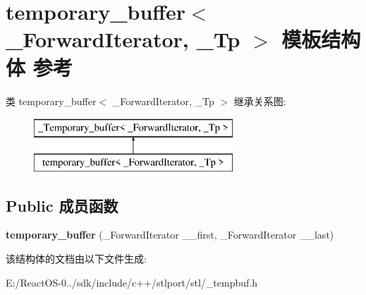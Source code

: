 \hypertarget{structtemporary__buffer}{}\section{temporary\+\_\+buffer$<$ \+\_\+\+Forward\+Iterator, \+\_\+\+Tp $>$ 模板结构体 参考}
\label{structtemporary__buffer}
类 temporary\+\_\+buffer$<$ \+\_\+\+Forward\+Iterator, \+\_\+\+Tp $>$ 继承关系图\+:\begin{figure}[H]
\begin{center}
\leavevmode
\includegraphics[height=2.000000cm]{structtemporary__buffer}
\end{center}
\end{figure}
\subsection*{Public 成员函数}
\begin{DoxyCompactItemize}
\item 
\mbox{\label{structtemporary__buffer_a5d694112b9dca43f4545ff35cac87419}} 
{\bfseries temporary\+\_\+buffer} (\+\_\+\+Forward\+Iterator \+\_\+\+\_\+first, \+\_\+\+Forward\+Iterator \+\_\+\+\_\+last)
\end{DoxyCompactItemize}


该结构体的文档由以下文件生成\+:\begin{DoxyCompactItemize}
\item 
E\+:/\+React\+O\+S-\/0../sdk/include/c++/stlport/stl/\+\_\+tempbuf.\+h\end{DoxyCompactItemize}
